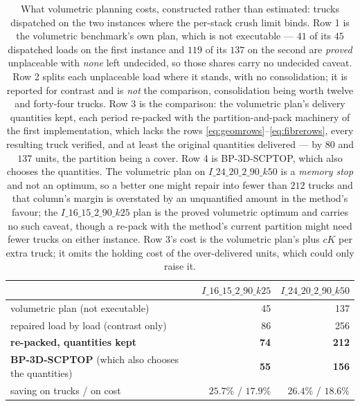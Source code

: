 \begin{table}[!t]
\centering
\small
\caption{What volumetric planning costs, constructed rather than
estimated: trucks dispatched on the two instances where the per-stack
crush limit binds. Row 1 is the volumetric benchmark's own plan, which
is not executable --- $41$ of its $45$ dispatched loads on the first
instance and $119$ of its $137$ on the second are \emph{proved}
unplaceable with \emph{none} left undecided, so those shares carry no
undecided caveat. Row 2 splits each unplaceable load where it stands,
with no consolidation; it is reported for contrast and is \emph{not}
the comparison, consolidation being worth twelve and forty-four trucks.
Row 3 is the comparison: the volumetric plan's delivery quantities
kept, each period re-packed with the partition-and-pack machinery of
the first implementation, which lacks the rows
\eqref{eq:geomrows}--\eqref{eq:fibrerows}, every resulting truck
verified, and at least the
original quantities delivered --- by $80$ and $137$ units, the
partition being a cover. Row 4 is BP-3D-SCPTOP, which also chooses the
quantities. The volumetric plan on $I\_24\_20\_2\_90\_k50$ is a
\emph{memory stop} and not an optimum, so a better one might repair into
fewer than $212$ trucks and that column's margin is overstated by an
unquantified amount in the method's favour; the
$I\_16\_15\_2\_90\_k25$ plan is the proved volumetric optimum and
carries no such caveat, though a re-pack with the method's current
partition might need fewer trucks on either instance. Row 3's cost is
the volumetric plan's plus $cK$ per extra truck; it omits the holding
cost of the over-delivered units, which could only raise it.}
\label{tab:repack}
\begin{tabular}{lrr}
\toprule
 & $I\_16\_15\_2\_90\_k25$ & $I\_24\_20\_2\_90\_k50$ \\
\midrule
volumetric plan (not executable)      & 45  & 137 \\
repaired load by load (contrast only) & 86  & 256 \\
\textbf{re-packed, quantities kept}   & \textbf{74} & \textbf{212} \\
\textbf{BP-3D-SCPTOP} (which also chooses the quantities) & \textbf{55} & \textbf{156} \\
\midrule
saving on trucks / on cost & $25.7\%$ / $17.9\%$ & $26.4\%$ / $18.6\%$ \\
\bottomrule
\end{tabular}
\end{table}

